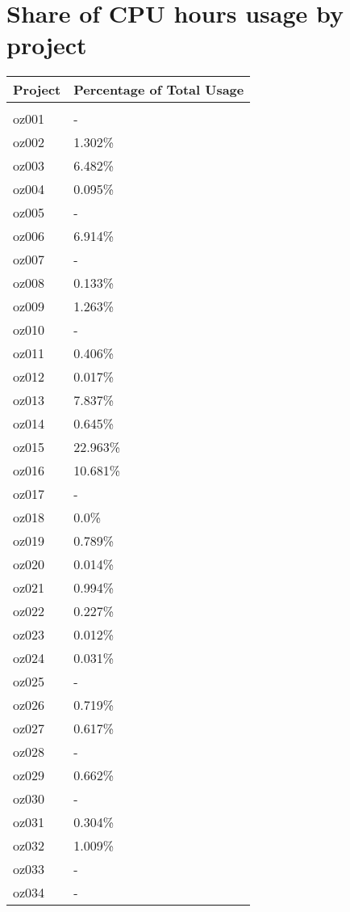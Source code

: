\documentclass{article}%
\begin{document}
\section{Share of CPU hours usage by project}%

%
\begin{longtabu}{X[l] X[r]}%
\textbf{Project}&\textbf{Percentage of Total Usage}\\%
\hline%
&\\%
oz001&{-}\\%
\hline%
oz002&1.302\%\\%
\hline%
oz003&6.482\%\\%
\hline%
oz004&0.095\%\\%
\hline%
oz005&{-}\\%
\hline%
oz006&6.914\%\\%
\hline%
oz007&{-}\\%
\hline%
oz008&0.133\%\\%
\hline%
oz009&1.263\%\\%
\hline%
oz010&{-}\\%
\hline%
oz011&0.406\%\\%
\hline%
oz012&0.017\%\\%
\hline%
oz013&7.837\%\\%
\hline%
oz014&0.645\%\\%
\hline%
oz015&22.963\%\\%
\hline%
oz016&10.681\%\\%
\hline%
oz017&{-}\\%
\hline%
oz018&0.0\%\\%
\hline%
oz019&0.789\%\\%
\hline%
oz020&0.014\%\\%
\hline%
oz021&0.994\%\\%
\hline%
oz022&0.227\%\\%
\hline%
oz023&0.012\%\\%
\hline%
oz024&0.031\%\\%
\hline%
oz025&{-}\\%
\hline%
oz026&0.719\%\\%
\hline%
oz027&0.617\%\\%
\hline%
oz028&{-}\\%
\hline%
oz029&0.662\%\\%
\hline%
oz030&{-}\\%
\hline%
oz031&0.304\%\\%
\hline%
oz032&1.009\%\\%
\hline%
oz033&{-}\\%
\hline%
oz034&{-}\\%

\end{longtabu}
\end{document}
